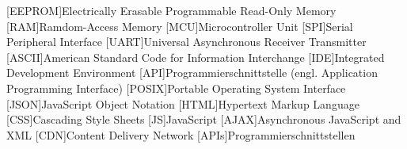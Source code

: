\begin{acronym}[xxxxxxxxx]
  [EEPROM]{Electrically Erasable Programmable Read-Only Memory}
  [RAM]{Ramdom-Access Memory}
  [MCU]{Microcontroller Unit}
  [SPI]{Serial Peripheral Interface}
  [UART]{Universal Asynchronous Receiver Transmitter}
  [ASCII]{American Standard Code for Information Interchange}
  [IDE]{Integrated Development Environment}
  [API]{Programmierschnittstelle (engl. Application Programming Interface)}
  [POSIX]{Portable Operating System Interface}
  [JSON]{JavaScript Object Notation}
  [HTML]{Hypertext Markup Language}
  [CSS]{Cascading Style Sheets}
  [JS]{JavaScript}
  [AJAX]{Asynchronous JavaScript and XML}
  [CDN]{Content Delivery Network}
  [APIs]{Programmierschnittstellen}
  
\end{acronym}

